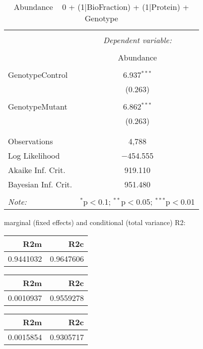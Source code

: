 \documentclass[11pt]{report}
\begin{document}
\begin{table}[!htbp] \centering 
  \caption{Abundance ~ 0 + (1|BioFraction) + (1|Protein) + Genotype} 
  \label{} 
\begin{tabular}{@{\extracolsep{5pt}}lc} 
\\[-1.8ex]\hline 
\hline \\[-1.8ex] 
 & \multicolumn{1}{c}{\textit{Dependent variable:}} \\ 
\cline{2-2} 
\\[-1.8ex] & Abundance \\ 
\hline \\[-1.8ex] 
 GenotypeControl & 6.937$^{***}$ \\ 
  & (0.263) \\ 
  & \\ 
 GenotypeMutant & 6.862$^{***}$ \\ 
  & (0.263) \\ 
  & \\ 
\hline \\[-1.8ex] 
Observations & 4,788 \\ 
Log Likelihood & $-$454.555 \\ 
Akaike Inf. Crit. & 919.110 \\ 
Bayesian Inf. Crit. & 951.480 \\ 
\hline 
\hline \\[-1.8ex] 
\textit{Note:}  & \multicolumn{1}{r}{$^{*}$p$<$0.1; $^{**}$p$<$0.05; $^{***}$p$<$0.01} \\ 
\end{tabular} 
\end{table} 
marginal (fixed effects) and conditional (total variance) R2:

\begin{tabular}{r|r}
\hline
R2m & R2c\\
\hline
0.9441032 & 0.9647606\\
\hline
\end{tabular}

\begin{tabular}{r|r}
\hline
R2m & R2c\\
\hline
0.0010937 & 0.9559278\\
\hline
\end{tabular}

\begin{tabular}{r|r}
\hline
R2m & R2c\\
\hline
0.0015854 & 0.9305717\\
\hline
\end{tabular}
\end{document}

